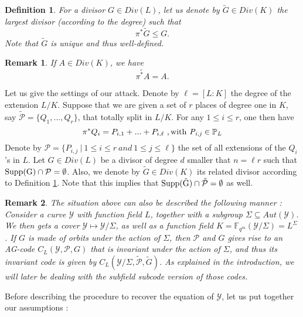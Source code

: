 \documentclass[10pt]{article}
\newtheorem{def1}{Definition}[]
\newtheorem{rq1}{Remark}[]
\newcommand{\s}{\vspace{0.3cm}}
\newcommand{\fqm}{\mathbb{F}_{q^m}}
\newcommand{\su}{\subseteq}
\newcommand{\Y}{\mathcal{Y}}
\newcommand{\PR}{\mathcal{P}}
\begin{document}
\s

\begin{def1} \label{pousséavant}
For a divisor $G \in Div(L)$, let us denote by $\tilde{G} \in Div(K)$ the largest divisor (according to the degree) such that
\[\pi^*\tilde{G} \leq G.\]
Note that $\tilde{G}$ is unique and thus well-defined.
\end{def1} 

\s 

\begin{rq1} \label{jsp}
If $A \in Div(K)$, we have 
\[\widetilde{\pi^*A}=A.\]
\end{rq1}

\s

Let us give the settings of our attack. Denote by $\ell=[L:K]$ the degree of the extension $L/K$. Suppose that we are given a set of $r$ places of degree one in $K$, say $\tilde{\PR} = \{Q_1,...,Q_r\}$, that totally split in $L/K$. For any $1 \leq i \leq r$, one then have 
\[\pi^*Q_i = P_{i,1} + ... + P_{i,\ell} \ , \rm with \it  \ P_{i,j} \in \mathbb{P}_L\]
Denote by $\PR = \{P_{i,j} \ | \ 1 \leq i \leq r \ and \ 1 \leq j \leq \ell\}$ the set of all extensions of the $Q_i$'s in $L$. Let $G \in Div(L)$ be a divisor of degree $d$ smaller that $n=\ell r$ such that $\rm{Supp}(G) \cap \PR = \emptyset$. Also, we denote by $\tilde{G} \in Div(K)$ its related divisor according to Definition \ref{pousséavant}.
Note that this implies that $\rm{Supp}(\tilde{G}) \cap \tilde{\PR} = \emptyset$ as well. 

\s

\begin{rq1} \rm
The situation above can also be described the following manner : Consider a curve $\Y$ with function field $L$, together with a subgroup $\Sigma \su Aut(\Y)$. We then gets a cover $\Y \longmapsto \Y/\Sigma$, as well as a function field $K = \fqm(\Y/\Sigma) = L^{\Sigma}$. If $G$ is made of orbits under the action of $\Sigma$, then $\PR$ and $G$ gives rise to an AG-code $C_L(\Y,\PR,G)$ that is invariant under the action of $\Sigma$, and thus its invariant code is given by $C_L(\Y/\Sigma,\tilde{\PR},\tilde{G})$. As explained in the introduction, we will later be dealing with the subfield subcode version of those codes.  
\end{rq1}

\s

Before describing the procedure to recover the equation of $\Y$, let us put together our assumptions :
\end{document}
